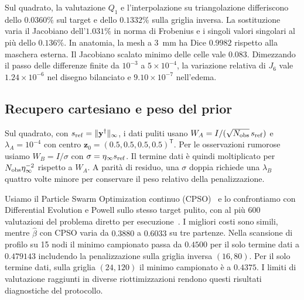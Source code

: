 Sul quadrato, la valutazione $Q_1$ e l'interpolazione su triangolazione differiscono dello $0.0360\%$ sul target e dello $0.1332\%$ sulla griglia inversa. La sostituzione varia il Jacobiano dell'$1.031\%$ in norma di Frobenius e i singoli valori singolari al più dello $0.136\%$. In anatomia, la mesh a 3~mm ha Dice $0.9982$ rispetto alla maschera esterna. Il Jacobiano scalato minimo delle celle vale $0.083$. Dimezzando il passo delle differenze finite da $10^{-3}$ a $5\times10^{-4}$, la variazione relativa di $J_6$ vale $1.24\times10^{-6}$ nel disegno bilanciato e $9.10\times10^{-7}$ nell'edema.

\subsection{Recupero cartesiano e peso del prior}
Sul quadrato, con $s_{\rm ref}=\|\mathbf y^\dagger\|_\infty$, i dati puliti usano $W_A=I/(\sqrt{N_{\rm obs}}\,s_{\rm ref})$ e $\lambda_A=10^{-4}$ con centro $\mathbf z_0=(0.5,0.5,0.5,0.5)^{\mathsf T}$. Per le osservazioni rumorose usiamo $W_B=I/\sigma$ con $\sigma=\eta_\infty s_{\rm ref}$. Il termine dati è quindi moltiplicato per $N_{\rm obs}\eta_\infty^{-2}$ rispetto a $W_A$. A parità di residuo, una $\sigma$ doppia richiede una $\lambda_B$ quattro volte minore per conservare il peso relativo della penalizzazione.

Usiamo il Particle Swarm Optimization continuo (CPSO)~\citep{kennedyndparticle,orlando2021analyticCPSO} e lo confrontiamo con Differential Evolution e Powell sullo stesso target pulito, con al più 600 valutazioni del problema diretto per esecuzione~\citep{storn1997differential,powell1964an}. I migliori costi sono simili, mentre $\widehat\beta$ con CPSO varia da $0.3880$ a $0.6033$ su tre partenze. Nella scansione di profilo su 15 nodi il minimo campionato passa da $0.4500$ per il solo termine dati a $0.479143$ includendo la penalizzazione sulla griglia inversa $(16,80)$. Per il solo termine dati, sulla griglia $(24,120)$ il minimo campionato è a $0.4375$. I limiti di valutazione raggiunti in diverse riottimizzazioni rendono questi risultati diagnostiche del protocollo.
